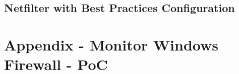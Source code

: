 \documentclass[12pt]{article}
\begin{document}


\subsection{Netfilter with Best Practices Configuration}
\label{appendix:netfilterBestAppendix}



\section{Appendix - Monitor Windows Firewall - PoC}
\label{appendix:monitorSolution}


\end{document}
